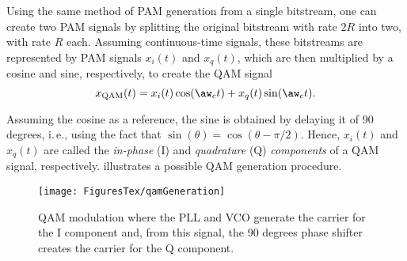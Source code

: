 
Using the same method of PAM generation from a single bitstream, one can create two PAM signals by splitting the original bitstream with rate $2 R$ into two, with rate $R$ each. Assuming continuous-time signals, these bitstreams are represented by PAM signals $x_i(t)$ and $x_q(t)$, which are then multiplied by a cosine and sine, respectively, to create the QAM signal
\begin{equation}
x_{\textrm{QAM}}(t) = x_i(t) \cos(\aw_c t) + x_q(t) \sin(\aw_c t).
\label{eq:qam}
\end{equation}

Assuming the cosine as a reference, the sine is obtained by delaying it of 90 degrees, i.\,e., using the fact that $\sin(\theta)=\cos(\theta-\pi/2)$. Hence, $x_i(t)$ and $x_q(t)$ are called the \emph{in-phase} (I) and \emph{quadrature} (Q) \emph{components} of a QAM signal, respectively.
 illustrates a possible QAM generation procedure.

\begin{figure}[htbp]
	\centering
		\texttt{[image: FiguresTex/qamGeneration]}		
	\caption{QAM modulation where the PLL and VCO generate the carrier for the I component and, from this signal, the 90 degrees phase shifter creates the carrier for the Q component.\label{fig:qamGeneration}}
\end{figure}



